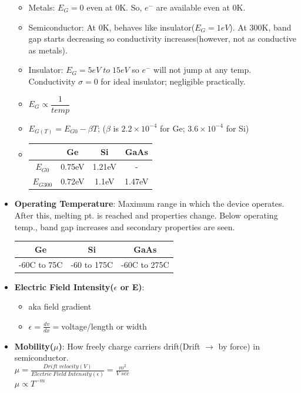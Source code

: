 \documentclass[10pt, a4paper]{report}
\begin{document}
\begin{itemize}
\begin{itemize}
			\item Metals: $ E_G = 0 $ even at 0K. So, $ e^- $ are available even at 0K.
			\item Semiconductor: At 0K, behaves like insulator($ E_G = 1eV $). At 300K, band gap starts decreasing so conductivity increases(however, not as conductive as metals).
			\item Insulator: $ E_G = 5eV \;to\; 15 eV $ so $ e^- $ will not jump at any temp. Conductivity $\sigma = 0$ for ideal insulator; negligible practically.
			\item $ E_G \propto \dfrac{1}{temp} $
			\item $ E_{G(T)} = E_{G0} - \beta T $; ($\beta$ is $ 2.2  \times  10^{-4} $ for Ge; $ 3.6 \times  10^{-4} $ for Si)
			\item \begin{tabular}{|c|c|c|c|}
				\hline
				& Ge & Si & GaAs \\
				\hline
				$ E_{G0} $ & 0.75eV & 1.21eV & - \\
				\hline
				$ E_{G300} $ & 0.72eV & 1.1eV & 1.47eV \\
				\hline
			\end{tabular}
		\end{itemize}
		\item \textbf{Operating Temperature}: Maximum range in which the device operates. After this, melting pt. is reached and properties change. Below operating temp., band gap increases and secondary properties are seen.
			\begin{tabular}{|c|c|c|}
				\hline
				Ge & Si & GaAs \\
				\hline
				-60C to 75C & -60 to 175C & -60C to 275C \\
				\hline
			\end{tabular}
		\item \textbf{Electric Field Intensity($\epsilon$ or E)}: 
			\begin{itemize}
				\item aka field gradient
				\item $ \epsilon= \frac{dv}{dx} = $voltage/length or width
			\end{itemize}
		\item \textbf{Mobility($\mu$)}: How freely charge carriers drift(Drift $\to$ by force) in semiconductor.\\
			$\mu = \frac{Drift\; velocity(V)}{Electric\;Field\;Intensity(\epsilon)} = \frac{m^2}{V\;sec}$\\
			$\mu \propto T^{-m}$\\

\end{itemize}
\end{document}
